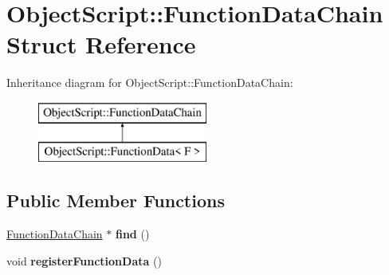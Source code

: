 \hypertarget{struct_object_script_1_1_function_data_chain}{}\section{Object\+Script\+:\+:Function\+Data\+Chain Struct Reference}
\label{struct_object_script_1_1_function_data_chain}
Inheritance diagram for Object\+Script\+:\+:Function\+Data\+Chain\+:\begin{figure}[H]
\begin{center}
\leavevmode
\includegraphics[height=2.000000cm]{struct_object_script_1_1_function_data_chain}
\end{center}
\end{figure}
\subsection*{Public Member Functions}
\begin{DoxyCompactItemize}
\item 
\hyperlink{struct_object_script_1_1_function_data_chain}{Function\+Data\+Chain} $\ast$ {\bfseries find} ()\hypertarget{struct_object_script_1_1_function_data_chain_af0eb1a23aa04aaeb7732093cc1404d66}{}\label{struct_object_script_1_1_function_data_chain_af0eb1a23aa04aaeb7732093cc1404d66}

\item 
void {\bfseries register\+Function\+Data} ()\hypertarget{struct_object_script_1_1_function_data_chain_a1f66af03689ce887d857984d5b27784a}{}\label{struct_object_script_1_1_function_data_chain_a1f66af03689ce887d857984d5b27784a}

\end{DoxyCompactItemize}
